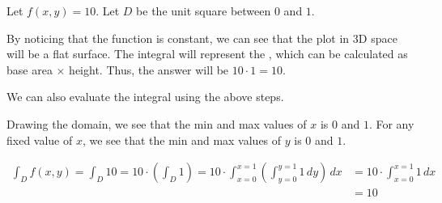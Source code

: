 \documentclass[11pt,fleqn]{book} %
\begin{document}
\begin{example}
    Let $f(x, y) = 10$. Let $D$ be the unit square between $0$ and $1$. 
    
    By noticing that the function is constant, we can see that the plot in 3D space will be a flat surface. The integral will represent the , which can be calculated as base area $\times$ height. Thus, the answer will be $10 \cdot 1 = 10$.

    We can also evaluate the integral using the above steps.

    Drawing the domain, we see that the min and max values of $x$ is $0$ and $1$. For any fixed value of $x$, we see that the min and max values of $y$ is $0$ and $1$.

    \begin{center}
    \end{center}
    \begin{align*}
        \int_D f(x,y)   = \int_D 10
                        = 10 \cdot \left( \int_D 1 \right)
                        = 10 \cdot \int_{x=0}^{x=1} \left( \int_{y=0}^{y=1} 1 \,dy \right) \,dx
                      & = 10 \cdot \int_{x=0}^{x=1} 1 \,dx                                      \\
                      & = 10
    \end{align*}
\end{example}
\end{document}
